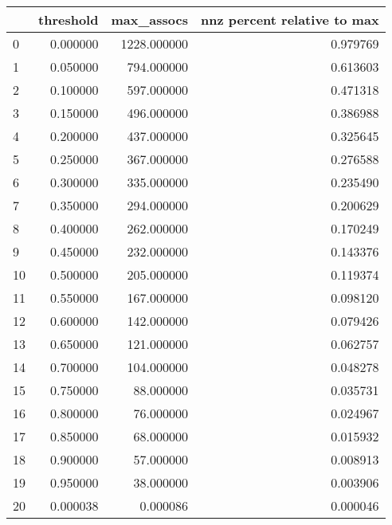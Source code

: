 \begin{tabular}{lrrr}
\toprule
{} &  threshold &   max\_assocs &  nnz percent relative to max \\
\midrule
0  &   0.000000 &  1228.000000 &                     0.979769 \\
1  &   0.050000 &   794.000000 &                     0.613603 \\
2  &   0.100000 &   597.000000 &                     0.471318 \\
3  &   0.150000 &   496.000000 &                     0.386988 \\
4  &   0.200000 &   437.000000 &                     0.325645 \\
5  &   0.250000 &   367.000000 &                     0.276588 \\
6  &   0.300000 &   335.000000 &                     0.235490 \\
7  &   0.350000 &   294.000000 &                     0.200629 \\
8  &   0.400000 &   262.000000 &                     0.170249 \\
9  &   0.450000 &   232.000000 &                     0.143376 \\
10 &   0.500000 &   205.000000 &                     0.119374 \\
11 &   0.550000 &   167.000000 &                     0.098120 \\
12 &   0.600000 &   142.000000 &                     0.079426 \\
13 &   0.650000 &   121.000000 &                     0.062757 \\
14 &   0.700000 &   104.000000 &                     0.048278 \\
15 &   0.750000 &    88.000000 &                     0.035731 \\
16 &   0.800000 &    76.000000 &                     0.024967 \\
17 &   0.850000 &    68.000000 &                     0.015932 \\
18 &   0.900000 &    57.000000 &                     0.008913 \\
19 &   0.950000 &    38.000000 &                     0.003906 \\
20 &   0.000038 &     0.000086 &                     0.000046 \\
\bottomrule
\end{tabular}

